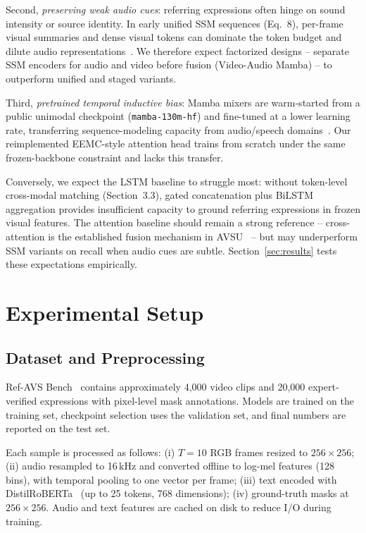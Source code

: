 \documentclass[a4paper,12pt]{extarticle}
\begin{document}
Second, \emph{preserving weak audio cues}: referring expressions often hinge on sound intensity or source identity. In early unified SSM sequences (Eq.~8), per-frame visual summaries and dense visual tokens can dominate the token budget and dilute audio representations~\cite{wang2024refavs}. We therefore expect factorized designs -- separate SSM encoders for audio and video before fusion (Video-Audio Mamba) -- to outperform unified and staged variants.

Third, \emph{pretrained temporal inductive bias}: Mamba mixers are warm-started from a public unimodal checkpoint (\texttt{mamba-130m-hf}) and fine-tuned at a lower learning rate, transferring sequence-modeling capacity from audio/speech domains~\cite{goel2022sashimi, erol2024audiomamba}. Our reimplemented EEMC-style attention head trains from scratch under the same frozen-backbone constraint and lacks this transfer.

Conversely, we expect the LSTM baseline to struggle most: without token-level cross-modal matching (Section~3.3), gated concatenation plus BiLSTM aggregation provides insufficient capacity to ground referring expressions in frozen visual features. The attention baseline should remain a strong reference -- cross-attention is the established fusion mechanism in AVSU~\cite{tsai2019multimodal, wang2024refavs} -- but may underperform SSM variants on recall when audio cues are subtle. Section~\ref{sec:results} tests these expectations empirically.

\section{Experimental Setup}

\subsection{Dataset and Preprocessing}

Ref-AVS Bench~\cite{wang2024refavs} contains approximately 4{,}000 video clips and 20{,}000 expert-verified expressions with pixel-level mask annotations. Models are trained on the training set, checkpoint selection uses the validation set, and final numbers are reported on the test set.

Each sample is processed as follows: (i) $T{=}10$ RGB frames resized to $256{\times}256$; (ii) audio resampled to 16\,kHz and converted offline to log-mel features (128 bins), with temporal pooling to one vector per frame; (iii) text encoded with DistilRoBERTa~\cite{sanh2019distilroberta} (up to 25 tokens, 768 dimensions); (iv) ground-truth masks at $256{\times}256$. Audio and text features are cached on disk to reduce I/O during training.
\end{document}
